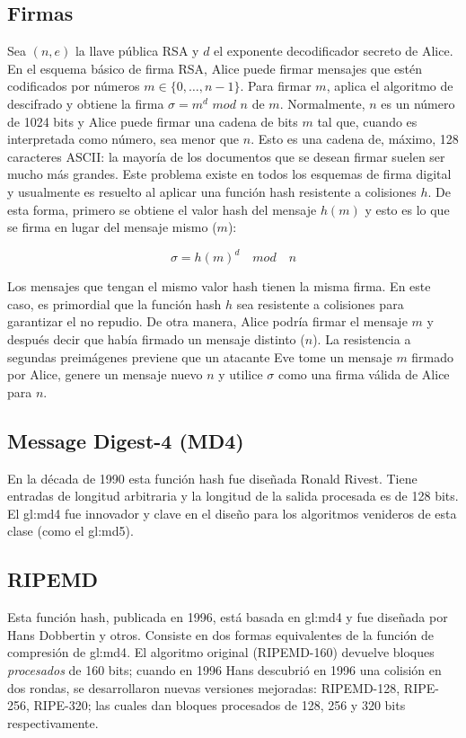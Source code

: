 \subsection{Firmas}
Sea $(n, e)$ la llave pública RSA y $d$ el exponente decodificador
secreto de Alice. En el esquema básico de firma RSA, Alice puede firmar
mensajes que estén codificados por números $ m \in \{0, \dots, n-1\}$.
Para firmar $m$, aplica el algoritmo de descifrado y obtiene la firma
$\sigma = m^d$ $mod$ $n$ de $m$.
Normalmente, $n$ es un número de 1024 bits y Alice puede firmar una
cadena de bits $m$ tal que, cuando es interpretada como número, sea
menor que $n$. Esto es una cadena de, máximo, 128 caracteres ASCII: la
mayoría de los documentos que se desean firmar suelen ser mucho más
grandes. Este problema existe en todos los esquemas de firma digital y
usualmente es resuelto al aplicar una función hash resistente a
colisiones $h$.
De esta forma, primero se obtiene el valor hash del mensaje $h(m)$ y
esto es lo que se firma en lugar del mensaje mismo ($m$):

\begin{equation}
  \label{funcion_hash_sign}
  \sigma = h(m)^d \quad mod \quad n
\end{equation}

Los mensajes que tengan el mismo valor hash tienen la misma firma. En
este caso, es primordial que la función hash $h$ sea resistente a
colisiones para garantizar el no repudio. De otra manera, Alice podría
firmar el mensaje $m$ y después decir que había firmado un mensaje
distinto ($n$).
La resistencia a segundas preimágenes previene que un atacante Eve tome
un mensaje $m$ firmado por Alice, genere un mensaje nuevo $n$ y utilice
$\sigma$ como una firma válida de Alice para $n$.

\subsection{Message Digest-4 (MD4)}
En la década de 1990 esta función hash fue diseñada Ronald Rivest.
Tiene entradas de longitud arbitraria y la longitud de la salida
procesada es de 128 bits. El \acrshort{gl:md4} fue innovador y
clave en el diseño para los algoritmos venideros de esta clase (como
el \acrshort{gl:md5}).

\subsection{RIPEMD}
Esta función hash, publicada en 1996, está basada en \acrshort{gl:md4} y fue
diseñada por Hans Dobbertin y otros. Consiste en dos formas equivalentes de la
función de compresión de \acrshort{gl:md4}. El algoritmo original (RIPEMD-160)
devuelve bloques \textit{procesados} de 160 bits; cuando en 1996 Hans
descubrió en 1996 una colisión en dos rondas, se desarrollaron nuevas versiones
mejoradas: RIPEMD-128, RIPE-256, RIPE-320; las cuales dan bloques procesados de
128, 256 y 320 bits respectivamente.

